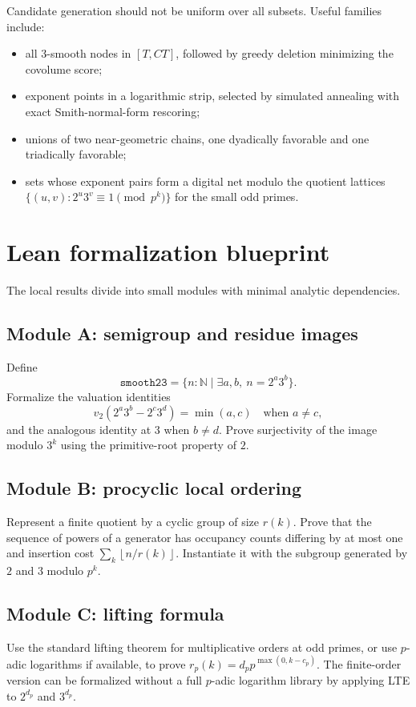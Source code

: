 \documentclass[11pt]{article}
\theoremstyle{definition}
\theoremstyle{remark}
\newcommand{\N}{\mathbb N}
\newcommand{\floor}[1]{\left\lfloor #1\right\rfloor}
\begin{document}
Candidate generation should not be uniform over all subsets.  Useful families include:
\begin{itemize}
\item all $3$-smooth nodes in $[T,CT]$, followed by greedy deletion minimizing the covolume score;
\item exponent points in a logarithmic strip, selected by simulated annealing with exact Smith-normal-form rescoring;
\item unions of two near-geometric chains, one dyadically favorable and one triadically favorable;
\item sets whose exponent pairs form a digital net modulo the quotient lattices
$\{(u,v):2^u3^v\equiv1\pmod{p^k}\}$ for the small odd primes.
\end{itemize}

\section{Lean formalization blueprint}

The local results divide into small modules with minimal analytic dependencies.

\subsection{Module A: semigroup and residue images}
Define
\[
  \texttt{smooth23} = \{n:\N\mid \exists a,b,\ n=2^a3^b\}.
\]
Formalize the valuation identities
\[
 v_2(2^a3^b-2^c3^d)=\min(a,c)
 \quad\text{when }a\ne c,
\]
and the analogous identity at $3$ when $b\ne d$.
Prove surjectivity of the image modulo $3^k$ using the primitive-root property of $2$.

\subsection{Module B: procyclic local ordering}
Represent a finite quotient by a cyclic group of size $r(k)$.  Prove that the sequence of powers of a generator has occupancy counts differing by at most one and insertion cost
$\sum_k\floor{n/r(k)}$.  Instantiate it with the subgroup generated by $2$ and $3$ modulo $p^k$.

\subsection{Module C: lifting formula}
Use the standard lifting theorem for multiplicative orders at odd primes, or use $p$-adic logarithms if available, to prove
$r_p(k)=d_pp^{\max(0,k-c_p)}$.  The finite-order version can be formalized without a full $p$-adic logarithm library by applying LTE to $2^{d_p}$ and $3^{d_p}$.
\end{document}

